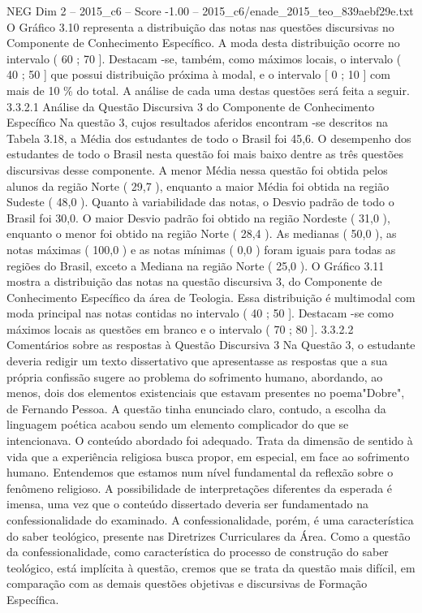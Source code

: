 \begin{textsample}{NEG Dim 2 – 2015\_c6 – Score -1.00 – 2015\_c6/enade\_2015\_teo\_839aebf29e.txt}
O Gráfico 3.10 representa a distribuição das notas nas questões discursivas no Componente de Conhecimento Específico.
A moda desta distribuição ocorre no intervalo ( 60 ; 70 ].
Destacam -se, também, como máximos locais, o intervalo ( 40 ; 50 ] que possui distribuição próxima à modal, e o intervalo [ 0 ; 10 ] com mais de 10 \% do total.
A análise de cada uma destas questões será feita a seguir. 3.3.2.1 Análise da Questão Discursiva 3 do Componente de Conhecimento Específico Na questão 3, cujos resultados aferidos encontram -se descritos na Tabela 3.18, a Média dos estudantes de todo o Brasil foi 45,6.
O desempenho dos estudantes de todo o Brasil nesta questão foi mais baixo dentre as três questões discursivas desse componente.
A menor Média nessa questão foi obtida pelos alunos da região Norte ( 29,7 ), enquanto a maior Média foi obtida na região Sudeste ( 48,0 ).
Quanto à variabilidade das notas, o Desvio padrão de todo o Brasil foi 30,0.
O maior Desvio padrão foi obtido na região Nordeste ( 31,0 ), enquanto o menor foi obtido na região Norte ( 28,4 ).
As medianas ( 50,0 ), as notas máximas ( 100,0 ) e as notas mínimas ( 0,0 ) foram iguais para todas as regiões do Brasil, exceto a Mediana na região Norte ( 25,0 ).
O Gráfico 3.11 mostra a distribuição das notas na questão discursiva 3, do Componente de Conhecimento Específico da área de Teologia.
Essa distribuição é multimodal com moda principal nas notas contidas no intervalo ( 40 ; 50 ].
Destacam -se como máximos locais as questões em branco e o intervalo ( 70 ; 80 ]. 3.3.2.2 Comentários sobre as respostas à Questão Discursiva 3 Na Questão 3, o estudante deveria redigir um texto dissertativo que apresentasse as respostas que a sua própria confissão sugere ao problema do sofrimento humano, abordando, ao menos, dois dos elementos existenciais que estavam presentes no poema"Dobre", de Fernando Pessoa.
A questão tinha enunciado claro, contudo, a escolha da linguagem poética acabou sendo um elemento complicador do que se intencionava.
O conteúdo abordado foi adequado.
Trata da dimensão de sentido à vida que a experiência religiosa busca propor, em especial, em face ao sofrimento humano.
Entendemos que estamos num nível fundamental da reflexão sobre o fenômeno religioso.
A possibilidade de interpretações diferentes da esperada é imensa, uma vez que o conteúdo dissertado deveria ser fundamentado na confessionalidade do examinado.
A confessionalidade, porém, é uma característica do saber teológico, presente nas Diretrizes Curriculares da Área.
Como a questão da confessionalidade, como característica do processo de construção do saber teológico, está implícita à questão, cremos que se trata da questão mais difícil, em comparação com as demais questões objetivas e discursivas de Formação Específica.

\end{textsample}
